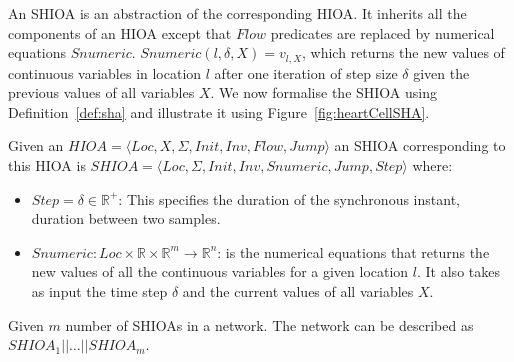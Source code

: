 An \ac{SHIOA} is an  abstraction of the corresponding \ac{HIOA}. 
It inherits all the
components of an \ac{HIOA} except that $Flow$ predicates are replaced by numerical equations $Snumeric$.
$Snumeric(l,\delta,X)=v_{l,X}$, which returns the new values of
continuous variables in location $l$ after one iteration of step size $\delta$ given the previous values of all variables $X$.
We now formalise
the \ac{SHIOA} using Definition~\ref{def:sha} and illustrate it using Figure~\ref{fig:heartCellSHA}.



\begin{definition}
  Given an $HIOA = \langle Loc, X, \Sigma, Init, Inv, Flow, Jump \rangle$
  an \ac{SHIOA} corresponding to this \ac{HIOA} is \newline
  $SHIOA = \langle Loc, \Sigma, Init, Inv, Snumeric, Jump, Step \rangle$
  where:
  \begin{itemize}
  \item $Step = \delta \in \mathbb{R}^+$: This specifies the duration of
    the synchronous instant, duration between two samples.
  \item
    $Snumeric: Loc \times \mathbb{R} \times \mathbb{R}^m \rightarrow
    \mathbb{R}^n$:
    is the numerical equations that returns the new values of all the
    continuous variables for a given location $l$.  It also takes as
    input the time step $\delta$ and the current values of all variables
    $X$.
  \end{itemize}
  \label{def:sha}
\end{definition}

Given  $m$   number of \acp{SHIOA} in a network.
The network can be described as $SHIOA_1 || \dots || SHIOA_m$.


